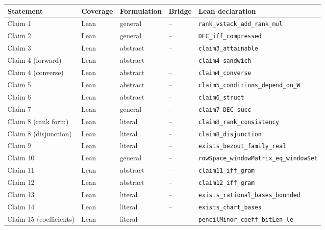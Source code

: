 \begin{tabular}{@{}>{\raggedright\arraybackslash}p{3.9cm}>{\raggedright\arraybackslash}p{1.55cm}>{\raggedright\arraybackslash}p{1.5cm}>{\raggedright\arraybackslash}p{1.5cm}>{\raggedright\arraybackslash}p{7.1cm}@{}}
\toprule
Statement & Coverage & Formulation & Bridge & Lean declaration \\
\midrule
Claim 1 & Lean & general & -- & \texttt{rank\_\allowbreak{}vstack\_\allowbreak{}add\_\allowbreak{}rank\_\allowbreak{}mul} \\
Claim 2 & Lean & general & -- & \texttt{DEC\_\allowbreak{}iff\_\allowbreak{}compressed} \\
Claim 3 & Lean & abstract & -- & \texttt{claim3\_\allowbreak{}attainable} \\
Claim 4 (forward) & Lean & abstract & -- & \texttt{claim4\_\allowbreak{}sandwich} \\
Claim 4 (converse) & Lean & abstract & -- & \texttt{claim4\_\allowbreak{}converse} \\
Claim 5 & Lean & abstract & -- & \texttt{claim5\_\allowbreak{}conditions\_\allowbreak{}depend\_\allowbreak{}on\_\allowbreak{}W} \\
Claim 6 & Lean & abstract & -- & \texttt{claim6\_\allowbreak{}struct} \\
Claim 7 & Lean & general & -- & \texttt{claim7\_\allowbreak{}DEC\_\allowbreak{}succ} \\
Claim 8 (rank form) & Lean & literal & -- & \texttt{claim8\_\allowbreak{}rank\_\allowbreak{}consistency} \\
Claim 8 (disjunction) & Lean & literal & -- & \texttt{claim8\_\allowbreak{}disjunction} \\
Claim 9 & Lean & literal & -- & \texttt{exists\_\allowbreak{}bezout\_\allowbreak{}family\_\allowbreak{}real} \\
Claim 10 & Lean & general & -- & \texttt{rowSpace\_\allowbreak{}windowMatrix\_\allowbreak{}eq\_\allowbreak{}windowSet} \\
Claim 11 & Lean & abstract & -- & \texttt{claim11\_\allowbreak{}iff\_\allowbreak{}gram} \\
Claim 12 & Lean & abstract & -- & \texttt{claim12\_\allowbreak{}iff\_\allowbreak{}gram} \\
Claim 13 & Lean & literal & -- & \texttt{exists\_\allowbreak{}rational\_\allowbreak{}bases\_\allowbreak{}bounded} \\
Claim 14 & Lean & literal & -- & \texttt{exists\_\allowbreak{}chart\_\allowbreak{}bases} \\
Claim 15 (coefficients) & Lean & literal & -- & \texttt{pencilMinor\_\allowbreak{}coeff\_\allowbreak{}bitLen\_\allowbreak{}le} \\

\end{tabular}
